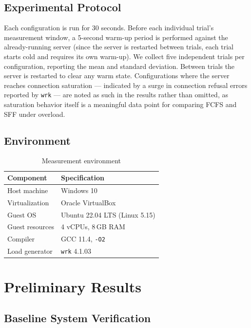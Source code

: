 \documentclass[conference]{IEEEtran}
\begin{document}
\subsection{Experimental Protocol}

Each configuration is run for 30 seconds. Before each individual trial's
measurement window, a 5-second warm-up period is performed against the
already-running server (since the server is restarted between trials,
each trial starts cold and requires its own warm-up). We collect five
independent trials per configuration, reporting the mean and standard
deviation. Between trials the server is restarted to clear any warm state.
Configurations where the server reaches connection saturation --- indicated
by a surge in connection refusal errors reported by \texttt{wrk} --- are
noted as such in the results rather than omitted, as saturation behavior
itself is a meaningful data point for comparing FCFS and SFF under overload.

\subsection{Environment}

\begin{table}[h]
\centering
\caption{Measurement environment}
\label{tab:env}
\begin{tabular}{@{}ll@{}}
\toprule
\textbf{Component} & \textbf{Specification} \\
\midrule
Host machine    & Windows 10 \\
Virtualization  & Oracle VirtualBox \\
Guest OS        & Ubuntu 22.04 LTS (Linux 5.15) \\
Guest resources & 4 vCPUs, 8\,GB RAM \\
Compiler        & GCC 11.4, \texttt{-O2} \\
Load generator  & \texttt{wrk} 4.1.03\\
\bottomrule
\end{tabular}
\end{table}

\section{Preliminary Results}
\label{sec:results}

\subsection{Baseline System Verification}
\end{document}
